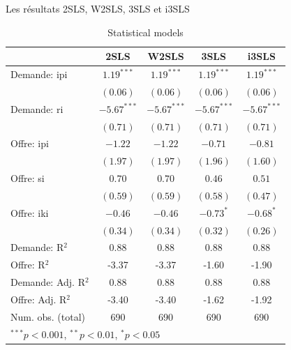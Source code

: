 \documentclass[11pt,ignorenonframetext,]{beamer}
\begin{document}
\begin{frame}{Les résultats 2SLS, W2SLS, 3SLS et i3SLS}
\protect\hypertarget{les-resultats-2sls-w2sls-3sls-et-i3sls}{}

\tiny

\begin{table}
\begin{center}
\begin{tabular}{l c c c c }
\hline
 & 2SLS & W2SLS & 3SLS & i3SLS \\
\hline
Demande: ipi        & $1.19^{***}$  & $1.19^{***}$  & $1.19^{***}$  & $1.19^{***}$  \\
                    & $(0.06)$      & $(0.06)$      & $(0.06)$      & $(0.06)$      \\
Demande: ri         & $-5.67^{***}$ & $-5.67^{***}$ & $-5.67^{***}$ & $-5.67^{***}$ \\
                    & $(0.71)$      & $(0.71)$      & $(0.71)$      & $(0.71)$      \\
Offre: ipi          & $-1.22$       & $-1.22$       & $-0.71$       & $-0.81$       \\
                    & $(1.97)$      & $(1.97)$      & $(1.96)$      & $(1.60)$      \\
Offre: si           & $0.70$        & $0.70$        & $0.46$        & $0.51$        \\
                    & $(0.59)$      & $(0.59)$      & $(0.58)$      & $(0.47)$      \\
Offre: iki          & $-0.46$       & $-0.46$       & $-0.73^{*}$   & $-0.68^{*}$   \\
                    & $(0.34)$      & $(0.34)$      & $(0.32)$      & $(0.26)$      \\
\hline
Demande: R$^2$      & 0.88          & 0.88          & 0.88          & 0.88          \\
Offre: R$^2$        & -3.37         & -3.37         & -1.60         & -1.90         \\
Demande: Adj. R$^2$ & 0.88          & 0.88          & 0.88          & 0.88          \\
Offre: Adj. R$^2$   & -3.40         & -3.40         & -1.62         & -1.92         \\
Num. obs. (total)   & 690           & 690           & 690           & 690           \\
\hline
\multicolumn{5}{l}{\scriptsize{$^{***}p<0.001$, $^{**}p<0.01$, $^*p<0.05$}}
\end{tabular}
\caption{Statistical models}
\label{table : 2sls, w2sls, 3sls and fiml}
\end{center}
\end{table}
\tiny

\end{frame}
\end{document}

